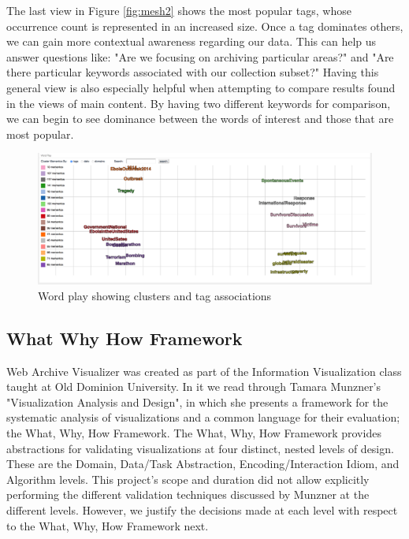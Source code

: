 \documentclass[10pt,journal,compsoc]{IEEEtran}
\begin{document}
The last view in Figure \ref{fig:mesh2} shows the most popular tags, whose occurrence count is represented in an increased size. Once a tag dominates others, we can gain more contextual awareness regarding our data. This can help us answer questions like: "Are we focusing on archiving particular areas?" and "Are there particular keywords associated with our collection subset?" Having this general view is also especially helpful when attempting to compare results found in the views of main content. By having two different keywords for comparison, we can begin to see dominance between the words of interest and those that are most popular. \par

\begin{figure}
\centering
\includegraphics[width=\textwidth]{Figure6}
\caption{Word play showing clusters and tag associations}
\label{fig:mesh6}
\end{figure}


\subsection{What Why How Framework}
Web Archive Visualizer was created as part of the Information Visualization class taught
at Old Dominion University. In it we read through Tamara Munzner's "Visualization 
Analysis and Design", in which she presents a framework for the systematic analysis
of visualizations and a common language for their evaluation; the What, Why, How 
Framework. The What, Why, How Framework provides abstractions for validating visualizations
at four distinct, nested levels of design. These are the Domain, Data/Task Abstraction, Encoding/Interaction Idiom, and Algorithm levels.
This project's scope and duration did not allow explicitly performing the different
validation techniques discussed by Munzner at the different levels. 
However, we justify the decisions made at each level with respect to the What, Why, How 
Framework next.
\end{document}

